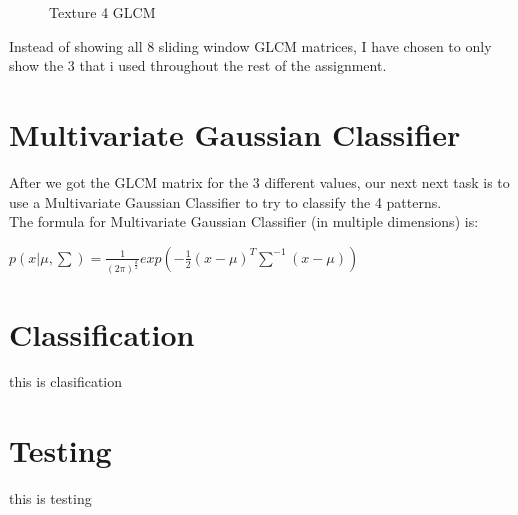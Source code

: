 \documentclass{article}
\begin{document}
	\begin{figure}[h]%
		\centering
    	\caption{Texture 4 GLCM}%
    	\label{fig:o1_f4}%
	\end{figure}


Instead of showing all 8 sliding window GLCM matrices, I have chosen to only show the 3 that i used throughout the rest of the assignment.


\section{Multivariate Gaussian Classifier}
	After we got the GLCM matrix for the 3 different values, our next next task is to use a Multivariate Gaussian Classifier to try to classify the 4 patterns.\\
		
	The formula for Multivariate Gaussian Classifier (in multiple dimensions) is:
	\begin{center}
		$p ( x | \mu , \sum)=\frac{1}{(2\pi)^{\frac{d}{2}}}exp\left(-\frac{1}{2}(x-\mu)^T\sum^{-1}(x-\mu)\right)$
	\end{center}
	
\section{Classification}
	this is clasification

\section{Testing}
	this is testing
	
\end{document}
